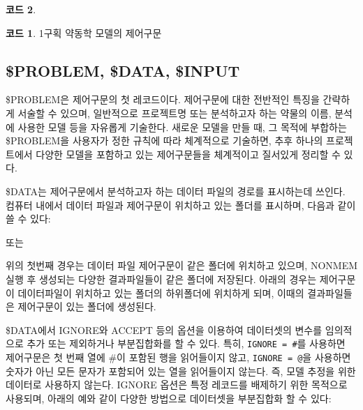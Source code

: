 \documentclass[
  10pt,
  krantz2,
  a4paper]{krantz}
\newenvironment{Shaded}{\begin{snugshade}}{\end{snugshade}}
\newcommand{\ErrorTok}[1]{\textcolor[rgb]{0.64,0.00,0.00}{\textbf{#1}}}
\newcommand{\NormalTok}[1]{#1}
\newcommand{\OperatorTok}[1]{\textcolor[rgb]{0.81,0.36,0.00}{\textbf{#1}}}
\newcommand{\StringTok}[1]{\textcolor[rgb]{0.31,0.60,0.02}{#1}}
\theoremstyle{definition}
\theoremstyle{definition}
\newtheorem{example}{코드}[chapter]
\theoremstyle{definition}
\theoremstyle{remark}
\begin{document}
\begin{example}
\begin{example}

\protect\hypertarget{exm:one-comp}{}{\label{exm:one-comp} }1구획 약동학 모델의 제어구문

\end{example}
\end{example}

\hypertarget{problem-data-input}{%
\subsection{\$PROBLEM, \$DATA, \$INPUT}\label{problem-data-input}}

\$PROBLEM은 제어구문의 첫 레코드이다. 제어구문에 대한 전반적인 특징을 간략하게 서술할 수 있으며, 일반적으로 프로젝트명 또는 분석하고자 하는 약물의 이름, 분석에 사용한 모델 등을 자유롭게 기술한다. 새로운 모델을 만들 때, 그 목적에 부합하는 \$PROBLEM을 사용자가 정한 규칙에 따라 체계적으로 기술하면, 추후 하나의 프로젝트에서 다양한 모델을 포함하고 있는 제어구문들을 체계적이고 질서있게 정리할 수 있다.

\$DATA는 제어구문에서 분석하고자 하는 데이터 파일의 경로를 표시하는데 쓰인다. 컴퓨터 내에서 데이터 파일과 제어구문이 위치하고 있는 폴더를 표시하며, 다음과 같이 쓸 수 있다:

\begin{Shaded}
\end{Shaded}

또는

\begin{Shaded}
\end{Shaded}

위의 첫번째 경우는 데이터 파일 제어구문이 같은 폴더에 위치하고 있으며, NONMEM 실행 후 생성되는 다양한 결과파일들이 같은 폴더에 저장된다. 아래의 경우는 제어구문이 데이터파일이 위치하고 있는 폴더의 하위폴더에 위치하게 되며, 이때의 결과파일들은 제어구문이 있는 폴더에 생성된다.

\$DATA에서 IGNORE와 ACCEPT 등의 옵션을 이용하여 데이터셋의 변수를 임의적으로 추가 또는 제외하거나 부분집합화를 할 수 있다. 특히, \texttt{IGNORE\ =\ \#}를 사용하면 제어구문은 첫 번째 열에 \#이 포함된 행을 읽어들이지 않고, \texttt{IGNORE\ =\ @}을 사용하면 숫자가 아닌 모든 문자가 포함되어 있는 열을 읽어들이지 않는다. 즉, 모델 추정을 위한 데이터로 사용하지 않는다. IGNORE 옵션은 특정 레코드를 배제하기 위한 목적으로 사용되며, 아래의 예와 같이 다양한 방법으로 데이터셋을 부분집합화 할 수 있다:
\end{document}
